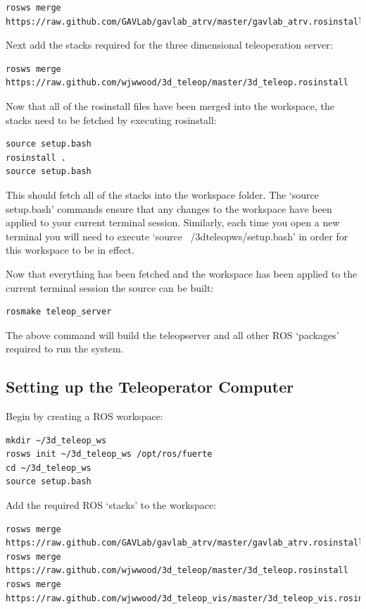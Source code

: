 \documentclass[12pt]{report}
\begin{document}
\begin{verbatim}
rosws merge https://raw.github.com/GAVLab/gavlab_atrv/master/gavlab_atrv.rosinstall
\end{verbatim}

Next add the stacks required for the three dimensional teleoperation server:

\begin{verbatim}
rosws merge https://raw.github.com/wjwwood/3d_teleop/master/3d_teleop.rosinstall
\end{verbatim}

Now that all of the rosinstall files have been merged into the workspace, the stacks need to be fetched by executing rosinstall:

\begin{verbatim}
source setup.bash
rosinstall .
source setup.bash
\end{verbatim}

This should fetch all of the stacks into the workspace folder.  The `source setup.bash' commands ensure that any changes to the workspace have been applied to your current terminal session.  Similarly, each time you open a new terminal you will need to execute `source ~/3d\textunderscore{}teleop\textunderscore{}ws/setup.bash' in order for this workspace to be in effect.

Now that everything has been fetched and the workspace has been applied to the current terminal session the source can be built:

\begin{verbatim}
rosmake teleop_server
\end{verbatim}

The above command will build the teleop\textunderscore{}server and all other ROS `packages' required to run the system.

\subsection{Setting up the Teleoperator Computer}
Begin by creating a ROS workspace:

\begin{verbatim}
mkdir ~/3d_teleop_ws
rosws init ~/3d_teleop_ws /opt/ros/fuerte
cd ~/3d_teleop_ws
source setup.bash
\end{verbatim}

Add the required ROS `stacks' to the workspace:

\begin{verbatim}
rosws merge https://raw.github.com/GAVLab/gavlab_atrv/master/gavlab_atrv.rosinstall
rosws merge https://raw.github.com/wjwwood/3d_teleop/master/3d_teleop.rosinstall
rosws merge https://raw.github.com/wjwwood/3d_teleop_vis/master/3d_teleop_vis.rosinstall
\end{verbatim}
\end{document}

